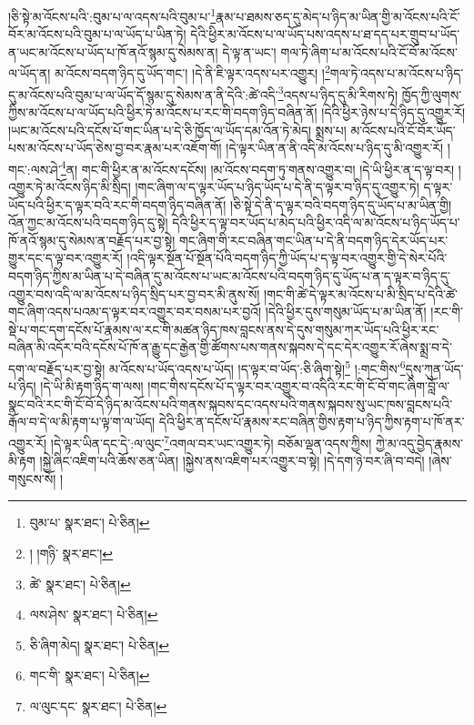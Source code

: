 །ཅི་སྟེ་མ་འོངས་པའི་:བུམ་པ་ལ་འདས་པའི་བུམ་པ་\footnote{བུམ་པ་  སྣར་ཐང་།  པེ་ཅིན། }རྣམ་པ་ཐམས་ཅད་དུ་མེད་པ་ཉིད་མ་ཡིན་གྱི་མ་འོངས་པའི་ངོ་བོར་མ་འོངས་པའི་བུམ་པ་ལ་ཡོད་པ་ཡིན་ཏེ། དེའི་ཕྱིར་མ་འོངས་པ་ལ་ཡོད་པས་འདས་པ་ཐ་དད་པར་གྲུབ་པ་ཡོད་ན་ཡང་མ་འོངས་པ་ཡོད་པ་ཁོ་ནའོ་སྙམ་དུ་སེམས་ན། དེ་ལྟ་ན་ཡང་། གལ་ཏེ་ཞིག་པ་མ་འོངས་པའི་ངོ་བོ་མ་འོངས་ལ་ཡོད་ན། མ་འོངས་བདག་ཉིད་དུ་ཡོད་གང་། །དེ་ནི་ཇི་ལྟར་འདས་པར་འགྱུར། །\footnote{། །གཉི་  སྣར་ཐང་། }གལ་ཏེ་འདས་པ་མ་འོངས་པ་ཉིད་དུ་མ་འོངས་པའི་བུམ་པ་ལ་ཡོད་དོ་སྙམ་དུ་སེམས་ན་ནི་དེའི་:ཚེ་འདི་\footnote{ཚེ་  སྣར་ཐང་།  པེ་ཅིན། }འདས་པ་ཉིད་དུ་མི་རིགས་ཏེ། ཁྱོད་ཀྱི་ལུགས་ཀྱིས་མ་འོངས་པ་ལ་ཡོད་པའི་ཕྱིར་ཏེ་མ་འོངས་པ་རང་གི་བདག་ཉིད་བཞིན་ནོ། །དེའི་ཕྱིར་ཉེས་པ་དེ་ཉིད་དུ་འགྱུར་རོ། །ཡང་མ་འོངས་པའི་དངོས་པོ་གང་ཡིན་པ་དེ་ཅི་ཁྱོད་ལ་ཡོད་དམ་འོན་ཏེ་མེད། སྨྲས་པ། མ་འོངས་པའི་ངོ་བོར་ཡོད་པས་མ་འོངས་པ་ཡོད་ཅེས་བྱ་བར་རྣམ་པར་འཇོག་གོ། །དེ་ལྟར་ཡིན་ན་ནི་འདི་མ་འོངས་པ་ཉིད་དུ་མི་འགྱུར་རོ། །གང་:ལས་ཤེ་\footnote{ལས་ཤེས་  སྣར་ཐང་།  པེ་ཅིན། }ན། གང་གི་ཕྱིར་ན་མ་འོངས་དངོས། །མ་འོངས་བདག་ཏུ་གནས་འགྱུར་བ། །དེ་ཡི་ཕྱིར་ན་ད་ལྟ་བར། །འགྱུར་ཏེ་མ་འོངས་ཉིད་མི་སྲིད། །གང་ཞིག་ལ་ད་ལྟར་ཡོད་པ་ཉིད་ཡོད་པ་དེ་ནི་ད་ལྟར་བ་ཉིད་དུ་འགྱུར་ཏེ། ད་ལྟར་ཡོད་པའི་ཕྱིར་ད་ལྟར་བའི་རང་གི་བདག་ཉིད་བཞིན་ནོ། །ཅི་སྟེ་དེ་ནི་ད་ལྟར་བའི་བདག་ཉིད་དུ་ཡོད་པ་མ་ཡིན་གྱི། འོན་ཀྱང་མ་འོངས་པའི་བདག་ཉིད་དུ་སྟེ། དེའི་ཕྱིར་ད་ལྟ་བར་ཡོད་པ་མེད་པའི་ཕྱིར་འདི་ལ་མ་འོངས་པ་ཉིད་ཡོད་པ་ཁོ་ནའོ་སྙམ་དུ་སེམས་ན་བརྗོད་པར་བྱ་སྟེ། གང་ཞིག་གི་རང་བཞིན་གང་ཡིན་པ་དེ་ནི་བདག་ཉིད་དེར་ཡོད་པར་གྱུར་དང་ད་ལྟ་བར་འགྱུར་རོ། །འདི་ལྟར་སྔོན་པོ་སྔོན་པོའི་བདག་ཉིད་ཀྱི་ཡོད་པ་ད་ལྟ་བར་འགྱུར་གྱི་དེ་སེར་པོའི་བདག་ཉིད་ཀྱིས་མ་ཡིན་པ་དེ་བཞིན་དུ་མ་འོངས་པ་ཡང་མ་འོངས་པའི་བདག་ཉིད་དུ་ཡོད་པ་ན་ད་ལྟར་བ་ཉིད་དུ་འགྱུར་བས་འདི་ལ་མ་འོངས་པ་ཉིད་སྲིད་པར་བྱ་བར་མི་ནུས་སོ། །གང་གི་ཚེ་དེ་ལྟར་མ་འོངས་པ་མི་སྲིད་པ་དེའི་ཚེ་གང་ཞིག་འདས་པའམ་ད་ལྟར་བར་འགྱུར་བར་བསམ་པར་བྱའོ། །དེའི་ཕྱིར་དུས་གསུམ་ཡོད་པ་མ་ཡིན་ནོ། །རང་གི་སྡེ་པ་གང་དག་དངོས་པོ་རྣམས་ལ་རང་གི་མཚན་ཉིད་ཁས་བླངས་ནས་དེ་དུས་གསུམ་ཀར་ཡོད་པའི་ཕྱིར་རང་བཞིན་མི་འདོར་བའི་དངོས་པོ་ཁོ་ན་རྒྱུ་དང་རྒྱེན་གྱི་ཚོགས་པས་གནས་སྐབས་དེ་དང་དེར་འགྱུར་རོ་ཞེས་སྨྲ་བ་དེ་དག་ལ་བརྗོད་པར་བྱ་སྟེ། མ་འོངས་པ་ཡོད་འདས་པ་ཡོད། །ད་ལྟར་བ་ཡོད་:ཅི་ཞིག་སྟེ།\footnote{ཅི་ཞིག་མེད།  སྣར་ཐང་།  པེ་ཅིན། } །:གང་གིས་\footnote{གང་གི་  སྣར་ཐང་།  པེ་ཅིན། }དུས་ཀུན་ཡོད་པ་ཉིད། །དེ་ཡི་མི་རྟག་ཉིད་ག་ལས། །གང་གིས་དངོས་པོ་ད་ལྟར་བར་འགྱུར་བ་འདིའི་རང་གི་ངོ་བོ་གང་ཞིག་བློ་ལ་སྣང་བའི་རང་གི་ངོ་བོ་དེ་ཉིད་མ་འོངས་པའི་གནས་སྐབས་དང་འདས་པའི་གནས་སྐབས་སུ་ཡང་ཁས་བླངས་པའི་རྒོལ་བ་དེ་ལ་མི་རྟག་པ་ལྟ་ག་ལ་ཡོད། དེའི་ཕྱིར་ན་དངོས་པོ་རྣམས་རང་བཞིན་གྱིས་རྟག་པ་ཉིད་ཀྱིས་རྟག་པ་ཁོ་ནར་འགྱུར་རོ། །དེ་ལྟར་ཡིན་དང་དེ་:ལ་ལུང་\footnote{ལ་ལུང་དང་  སྣར་ཐང་།  པེ་ཅིན། }འགལ་བར་ཡང་འགྱུར་ཏེ། བཅོམ་ལྡན་འདས་ཀྱིས། ཀྱེ་མ་འདུ་བྱེད་རྣམས་མི་རྟག །སྐྱེ་ཞིང་འཇིག་པའི་ཆོས་ཅན་ཡིན། །སྐྱེས་ནས་འཇིག་པར་འགྱུར་བ་སྟེ། །དེ་དག་ཉེ་བར་ཞི་བ་བདེ། །ཞེས་གསུངས་སོ། །
